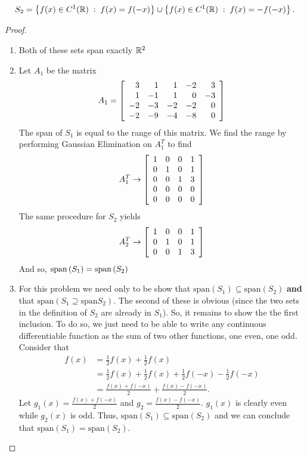 \documentclass{tutorial}
\begin{document}
\begin{prob}[Span]
\begin{enumerate}[label=(\alph*)]
\[
  S_2 = \left\{ f(x) \in C^1 (\mathbb{R}) \; : \; f(x) = f(-x) \right\} \cup \left\{ f(x) \in C^1(\mathbb{R}) \; : \; f(x) = -f(-x)\right\} .
\]
\end{enumerate}
\end{prob} \ifsolns \begin{proof} \mbox{}
\begin{enumerate}[label=(\alph*)]
\item Both of these sets span exactly $\mathbb{R}^2$
\item Let $A_1$ be the matrix
\[
  A_1 = \left[ \begin{array}{rrrrr}
     3 &    1 &    1 &   -2 &    3 \\
     1 &   -1 &    1 &    0 &   -3 \\
    -2 &   -3 &   -2 &   -2 &    0 \\
    -2 &   -9 &   -4 &   -8 &    0
  \end{array} \right]
\]
The span of $S_1$ is equal to the range of this matrix. We find the range by performing Gaussian Elimination on $A_1^T$ to find
\[
  A_1^T \rightarrow \left[ \begin{array}{rrrr}
     1 &    0 &    0 &   1 \\
     0 &    1 &    0 &   1 \\
     0 &    0 &    1 &   3 \\
     0 &    0 &    0 &   0 \\
     0 &    0 &    0 &   0
  \end{array} \right]
\]
The same procedure for $S_2$ yields
\[
  A_2^T \rightarrow \left[ \begin{array}{rrrr}
     1 &    0 &    0 &   1 \\
     0 &    1 &    0 &   1 \\
     0 &    0 &    1 &   3
  \end{array} \right]
\]
And so, $\mathrm{span} \left( S_1 \right) = \mathrm{span} \left( S_2 \right)$
\item For this problem we need only to be show that $\mathrm{span} (S_1) \subseteq \mathrm{span} (S_2)$ \textbf{and} that $\mathrm{span} (S_1 \supseteq \mathrm{span} S_2)$. The second of these is obvious (since the two sets in the definition of $S_2$ are already in $S_1$). So, it remains to show the the first inclusion. To do so, we just need to be able to write any continuous differentiable function as the sum of two other functions, one even, one odd. Consider that
\begin{align*}
  f(x)
  & = \frac{1}{2} f(x) + \frac{1}{2} f(x) \\
  & = \frac{1}{2} f(x) + \frac{1}{2} f(x) + \frac{1}{2} f(-x) - \frac{1}{2} f(-x) \\
  & = \frac{f(x) + f(-x)}{2} + \frac{f(x) - f(-x)}{2}.
\end{align*}
Let $g_1(x) = \frac{f(x) + f(-x)}{2}$ and $g_2 = \frac{f(x) - f(-x)}{2}$. $g_1(x)$ is clearly even while $g_2(x)$ is odd. Thus, $\mathrm{span} (S_1) \subseteq \mathrm{span} (S_2)$ and we can conclude that $\mathrm{span} (S_1) = \mathrm{span} (S_2)$.
\end{enumerate}
\end{proof}\else \newpage \fi
\end{document}
